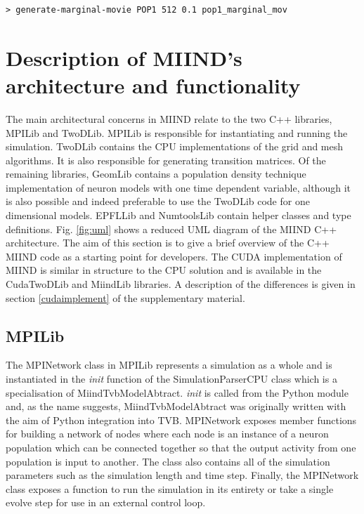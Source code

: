 \documentclass[utf8]{frontiersSCNS} %
\begin{document}
\begin{lstlisting}[language=xml,caption={Generate a marginals movie from the density files of population POP1 with a size of 512 pixels at a simulation replay time step of 0.1s.}]
> generate-marginal-movie POP1 512 0.1 pop1_marginal_mov
\end{lstlisting}

\section{Description of MIIND's architecture and functionality}
The main architectural concerns in MIIND relate to the two C++ libraries, MPILib and TwoDLib. MPILib is responsible for instantiating and running the simulation. TwoDLib contains the CPU implementations of the grid and mesh algorithms. It is also responsible for generating transition matrices. Of the remaining libraries, GeomLib contains a population density technique implementation of neuron models with one time dependent variable, although it is also possible and indeed preferable to use the TwoDLib code for one dimensional models. EPFLLib and NumtoolsLib contain helper classes and type definitions. Fig. \ref{fig:uml} shows a reduced UML diagram of the MIIND C++ architecture. The aim of this section is to give a brief overview of the C++ MIIND code as a starting point for developers. The CUDA implementation of MIIND is similar in structure to the CPU solution and is available in the CudaTwoDLib and MiindLib libraries. A description of the differences is given in section \ref{cudaimplement} of the supplementary material.\\

\subsection{MPILib}

The MPINetwork class in MPILib represents a simulation as a whole and is instantiated in the \textit{init} function of the SimulationParserCPU class which is a specialisation of MiindTvbModelAbtract. \textit{init} is called from the Python module and, as the name suggests, MiindTvbModelAbtract was originally written with the aim of Python integration into TVB. MPINetwork exposes member functions for building a network of nodes where each node is an instance of a neuron population which can be connected together so that the output activity from one population is input to another. The class also contains all of the simulation parameters such as the simulation length and time step. Finally, the MPINetwork class exposes a function to run the simulation in its entirety or take a single evolve step for use in an external control loop.\\
\end{document}
